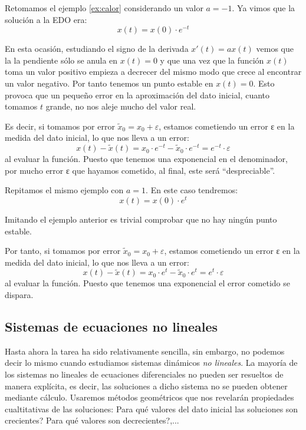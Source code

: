 \begin{example}
Retomamos el ejemplo \ref{ex:calor} considerando un valor $a=-1$. Ya vimos que la solución a la EDO era:
\[x(t) = x(0)\cdot e^{-t}\]

En esta ocasión, estudiando el signo de la derivada $x'(t)=ax(t)$ vemos que la la pendiente sólo se anula en $x(t)=0$ y que una vez que la función $x(t)$ toma un valor positivo empieza a decrecer del mismo modo que crece al encontrar un valor negativo. Por tanto tenemos un punto estable en $x(t)=0$. Esto provoca que un pequeño error en la aproximación del dato inicial, cuanto tomamos $t$ grande, no nos aleje mucho del valor real.

Es decir, si tomamos por error $\tilde{x}_0 = x_0 + ε$, estamos cometiendo un error ε en la medida del dato inicial, lo que nos lleva a un error:
\[x(t)-\tilde{x}(t) = x_0\cdot e^{-t} - \tilde{x}_0\cdot e^{-t} = e^{-t}\cdot ε\]
al evaluar la función. Puesto que tenemos una exponencial en el denominador, por mucho error ε que hayamos cometido, al final, este será ``despreciable''.
\end{example}

\begin{example}
Repitamos el mismo ejemplo con $a=1$. En este caso tendremos:
\[x(t) = x(0)\cdot e^{t}\]

Imitando el ejemplo anterior es trivial comprobar que no hay ningún punto estable.

Por tanto, si tomamos por error $\tilde{x}_0 = x_0 + ε$, estamos cometiendo un error ε en la medida del dato inicial, lo que nos lleva a un error:
\[x(t)-\tilde{x}(t) = x_0\cdot e^{t} - \tilde{x}_0\cdot e^{t} = e^{t}\cdot ε\]
al evaluar la función. Puesto que tenemos una exponencial el error cometido se dispara.
\end{example}

\subsection{Sistemas de ecuaciones no lineales}
Hasta ahora la tarea ha sido relativamente sencilla, sin embargo, no podemos decir lo mismo cuando estudiamos sistemas dinámicos \emph{no lineales}. La mayoría de los sistemas no lineales de ecuaciones diferenciales no pueden ser resueltos de manera explícita, es decir, las soluciones a dicho sistema no se pueden obtener mediante cálculo. Usaremos métodos geométricos que nos revelarán propiedades cualtitativas de las soluciones: Para qué valores del dato inicial las soluciones son crecientes? Para qué valores son decrecientes?,...

